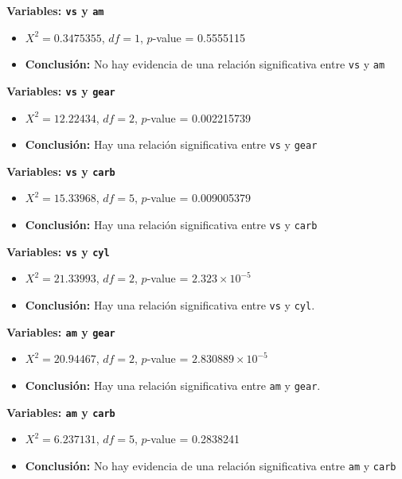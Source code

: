 \documentclass{article}
\begin{document}
\begin{flushleft}
\textbf{Variables: \texttt{vs} y \texttt{am}}
\begin{itemize}
    \item $X^2 = 0.3475355$, $df = 1$, $p$-value = 0.5555115
    \item \textbf{Conclusión:} No hay evidencia de una relación significativa entre \texttt{vs} y \texttt{am}
\end{itemize}

\textbf{Variables: \texttt{vs} y \texttt{gear}}
\begin{itemize}
    \item $X^2 = 12.22434$, $df = 2$, $p$-value = 0.002215739
    \item \textbf{Conclusión:} Hay una relación significativa entre \texttt{vs} y \texttt{gear}
\end{itemize}

\textbf{Variables: \texttt{vs} y \texttt{carb}}
\begin{itemize}
    \item $X^2 = 15.33968$, $df = 5$, $p$-value = 0.009005379
    \item \textbf{Conclusión:} Hay una relación significativa entre \texttt{vs} y \texttt{carb}
\end{itemize}

\textbf{Variables: \texttt{vs} y \texttt{cyl}}
\begin{itemize}
    \item $X^2 = 21.33993$, $df = 2$, $p$-value = $2.323 \times 10^{-5}$
    \item \textbf{Conclusión:} Hay una relación significativa entre \texttt{vs} y \texttt{cyl}.
\end{itemize}

\textbf{Variables: \texttt{am} y \texttt{gear}}
\begin{itemize}
    \item $X^2 = 20.94467$, $df = 2$, $p$-value = $2.830889 \times 10^{-5}$
    \item \textbf{Conclusión:} Hay una relación significativa entre \texttt{am} y \texttt{gear}.
\end{itemize}

\textbf{Variables: \texttt{am} y \texttt{carb}}
\begin{itemize}
    \item $X^2 = 6.237131$, $df = 5$, $p$-value = 0.2838241
    \item \textbf{Conclusión:} No hay evidencia de una relación significativa entre \texttt{am} y \texttt{carb}
\end{itemize}


\end{flushleft}
\end{document}
